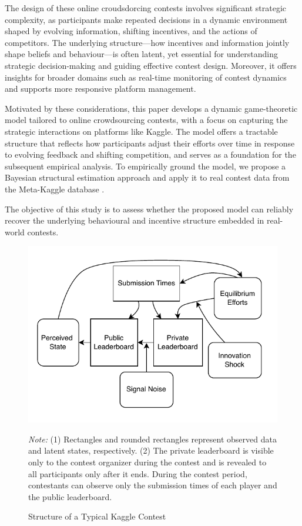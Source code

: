 \documentclass[mnsc]{informs3}
\begin{document}
The design of these online croudsdorcing contests involves significant strategic complexity, as participants make repeated decisions in a dynamic environment shaped by evolving information, shifting incentives, and the actions of competitors. 
The underlying structure—how incentives and information jointly shape beliefs and behaviour—is often latent, yet essential for understanding strategic decision-making and guiding effective contest design. 
Moreover, it offers insights for broader domains such as real-time monitoring of contest dynamics and supports more responsive platform management. 

Motivated by these considerations, this paper develops a dynamic game-theoretic model tailored to online crowdsourcing contests, with a focus on capturing the strategic interactions on platforms like Kaggle.
The model offers a tractable structure that reflects how participants adjust their efforts over time in response to evolving feedback and shifting competition, and serves as a foundation for the subsequent empirical analysis.
To empirically ground the model, we propose a Bayesian structural estimation approach and apply it to real contest data from the Meta-Kaggle database \citep{megan_risdal_timo_bozsolik_2022}.

The objective of this study is to assess whether the proposed model can reliably recover the underlying behavioural and incentive structure embedded in real-world contests.


\begin{figure}[!ht]
	\center
	\noindent\includegraphics[scale=1.2]{kaggledata_diagram_simplified.pdf}
	\caption{Structure of a Typical Kaggle Contest}
	\label{kaggledata-diagram-simplified}
	\begin{minipage}{\textwidth}
{\footnotesize
\medskip
\textit{Note:} (1) Rectangles and rounded rectangles represent observed data and latent states, respectively. 
(2) The private leaderboard is visible only to the contest organizer during the contest and is revealed to all participants only after it ends.
During the contest period, contestants can observe only the submission times of each player and the public leaderboard.
}
\end{minipage}
\end{figure}
\end{document}
